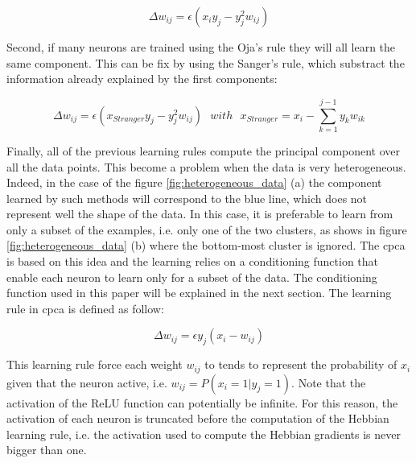 \documentclass[11pt]{report}
\begin{document}
\begin{equation}
\Delta w_{ij} = \epsilon (x_iy_j - y_j^2w_{ij})
\end{equation}

\noindent Second, if many neurons are trained using the Oja's rule they will all learn the same component. This can be fix by using the Sanger's rule, which substract the information already explained by the first components:

\begin{equation}
\Delta w_{ij} = \epsilon (x_{Stranger}y_j - y_j^2w_{ij})\ \ \ with\ \ \ x_{Stranger} = x_i - \sum_{k = 1}^{j - 1}{y_kw_{ik}}
\end{equation}

\noindent Finally, all of the previous learning rules compute the principal component over all the data points. This become a problem when the data is very heterogeneous. Indeed, in the case of the figure \ref{fig:heterogeneous_data} (a) the component learned by such methods will correspond to the blue line, which does not represent well the shape of the data. In this case, it is preferable to learn from only a subset of the examples, i.e. only one of the two clusters, as shows in figure \ref{fig:heterogeneous_data} (b) where the bottom-most cluster is ignored. The \acrshort{cpca} is based on this idea and the learning relies on a conditioning function that enable each neuron to learn only for a subset of the data. The conditioning function used in this paper will be explained in the next section. The learning rule in \acrshort{cpca} is defined as follow:

\begin{equation}
\Delta w_{ij} = \epsilon y_j (x_i - w_{ij})
\end{equation}

\noindent This learning rule force each weight $w_{ij}$ to tends to represent the probability of $x_i$ given that the neuron active, i.e. $w_{ij} = P(x_i = 1 | y_j = 1)$. Note that the activation of the ReLU function can potentially be infinite. For this reason, the activation of each neuron is truncated before the computation of the Hebbian learning rule, i.e. the activation used to compute the Hebbian gradients is never bigger than one.
\end{document}
